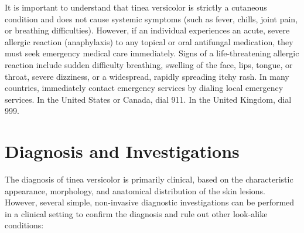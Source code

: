 It is important to understand that tinea versicolor is strictly a cutaneous condition and does not cause systemic symptoms (such as fever, chills, joint pain, or breathing difficulties). However, if an individual experiences an acute, severe allergic reaction (anaphylaxis) to any topical or oral antifungal medication, they must seek emergency medical care immediately. Signs of a life-threatening allergic reaction include sudden difficulty breathing, swelling of the face, lips, tongue, or throat, severe dizziness, or a widespread, rapidly spreading itchy rash. In many countries, immediately contact emergency services by dialing local emergency services. In the United States or Canada, dial 911. In the United Kingdom, dial 999.

\section*{Diagnosis and Investigations}
The diagnosis of tinea versicolor is primarily clinical, based on the characteristic appearance, morphology, and anatomical distribution of the skin lesions. However, several simple, non-invasive diagnostic investigations can be performed in a clinical setting to confirm the diagnosis and rule out other look-alike conditions:

